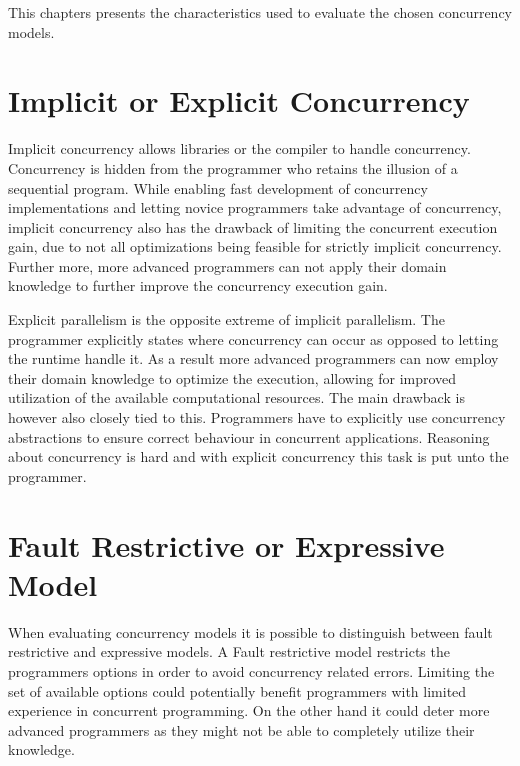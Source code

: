 \makeatletter {}\makeatother
{}
This chapters presents the characteristics used to evaluate the chosen concurrency models.
\label{chap:char}
\section{Implicit or Explicit Concurrency}
Implicit concurrency allows libraries or the compiler to handle concurrency. Concurrency is hidden from the programmer who retains the illusion of a sequential program\cite[p. 59]{sutter2005software}. While enabling fast development of concurrency implementations and letting novice programmers take advantage of concurrency, implicit concurrency also has the drawback of limiting the concurrent execution gain, due to not all optimizations being feasible for strictly implicit concurrency. Further more, more advanced programmers can not apply their domain knowledge to further improve the concurrency execution gain.

Explicit parallelism is the opposite extreme of implicit parallelism. The programmer explicitly states where concurrency can occur as opposed to letting the runtime handle it\cite[p. 59]{sutter2005software}. As a result more advanced programmers can now employ their domain knowledge to optimize the execution, allowing for improved utilization of the available computational resources. The main drawback is however also closely tied to this. Programmers have to explicitly use concurrency abstractions to ensure correct behaviour in concurrent applications. Reasoning about concurrency is hard\cite[p. 56]{sutter2005software} and with explicit concurrency this task is put unto the programmer.

\section{Fault Restrictive or Expressive Model}
When evaluating concurrency models it is possible to distinguish between fault restrictive and expressive models. A Fault restrictive model restricts the programmers options in order to avoid concurrency related errors. Limiting the set of available options could potentially benefit programmers with limited experience in concurrent programming. On the other hand it could deter more advanced programmers as they might not be able to completely utilize their knowledge.

